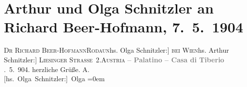 

         
         \renewcommand{\erwaehntePersonen}{Personen: Richard Beer-Hofmann, Olga Schnitzler}
         \renewcommand{\erwaehnteOrte}{Orte: Domus Tiberiana, Liesingerstraße, Palatin, Rodaun, Rom, Wien, Österreich}
         \renewcommand{\erwaehnteWerke}{}
               \section[Arthur und Olga Schnitzler an Richard Beer-Hofmann, 7. 5. 1904]{ Arthur und Olga Schnitzler an Richard Beer-Hofmann, 7. 5. 1904}\nopagebreak{}\rehead{ }\begin{ledgroupsized}[t]{13cm}\normalsize\beginnumbering \toendnotes[C]{\smallbreak\pagebreak[2]} 
\pstart{}{\pb}\textsc{Dr Richard Beer-Hofmann}\pend{}\pstart{}\textsc{Rodaun}\introOben{}{[}hs. Olga Schnitzler:{]} \textsc{bei Wien}\introOben{}\pend{}\pstart{}{[}hs. Arthur Schnitzler:{]} \textsc{Liesinger Straße 2}.\pend{}\pstart{}\textsc{Austria}\pend{}{\bigskip}\pstart
           \noindent{}\centering{}{\pb}\textcolor{gray}{\textbf{ – Palatino – Casa di Tiberio}}\pend
           . 5. 904.\pend
           \pstart
           herzliche Grüße.\pend
           \pstart
           \spacefill\mbox{A.}{\\[\baselineskip]}\spacefill\mbox{{[}hs. Olga Schnitzler:{]} Olga}\pend
           \leftskip=0em{}
         
         \endnumbering{}\end{ledgroupsized}  \newcommand{\dateiname}{L01398}\newcommand{\titel}{Arthur und Olga Schnitzler an Richard Beer-Hofmann, 7. 5. 1904}\newcommand{\editorInnen}{Martin Anton Müller und Gerd-Hermann Susen}
      